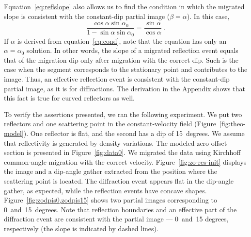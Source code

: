 
Equation~\ref{eq:reflslope} also allows us to find the condition in which the migrated slope is consistent with the constant-dip
partial image ($\beta=\alpha$). In this case,
\begin{equation}
\label{eq:cond}
\frac{\cos \alpha \sin \alpha_0}{1 - \sin \alpha \sin \alpha_0} = \frac {\sin \alpha}{\cos \alpha}\;.
\end{equation}
If $\alpha$ is derived from equation~\ref{eq:cond}, note that the equation has only an $\alpha=\alpha_0$ solution. In other words,
the slope of a migrated reflection event equals that of the migration dip only after migration with the correct dip. Such is the case when
the segment corresponds to the stationary point and contributes to the image. Thus, an effective reflection event is consistent
with the constant-dip partial image, as it is for diffractions. The derivation in the Appendix shows that this fact is true for curved reflectors
as well.

To verify the assertions presented, we ran the following experiment. We put two reflectors and one scattering point in the constant-velocity field
(Figure~\ref{fig:theo-model}). One reflector is flat, and the second has a dip of 15~degrees. We assume that reflectivity is generated
by density variations. The modeled zero-offset section is presented in Figure~\ref{fig:data0}. We migrated the data using Kirchhoff common-angle
migration with the correct velocity. Figure~\ref{fig:zo-res-init} displays the image and a dip-angle gather extracted from 
the position where the scattering point is located. The diffraction event appears flat in the dip-angle gather, as expected, while the reflection
events have concave shapes. Figure~\ref{fig:zodpis0,zodpis15} shows two partial images corresponding to 0~and~15~degrees.
Note that reflection boundaries and an effective part of the diffraction event are consistent with the partial image --- 0~and~15 degrees, 
respectively (the slope is indicated by dashed lines).

